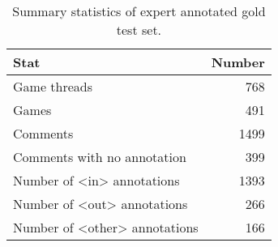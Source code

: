 \begin{table}[t]
    \centering
    \begin{tabular}{lr}
        \toprule
        \textbf{Stat} & \textbf{Number} \\\midrule
        Game threads & 768 \\ \midrule
        Games & 491 \\ \midrule
        Comments  & 1499 \\ \midrule
        Comments with no annotation & 399 \\  \midrule
        Number of <in> annotations & 1393 \\\midrule
        Number of <out> annotations & 266 \\\midrule
        Number of <other> annotations & 166 \\\bottomrule
    \end{tabular}
    \caption{Summary statistics of expert annotated gold test set.}
    \label{tab:test-football-stats}
\end{table}
